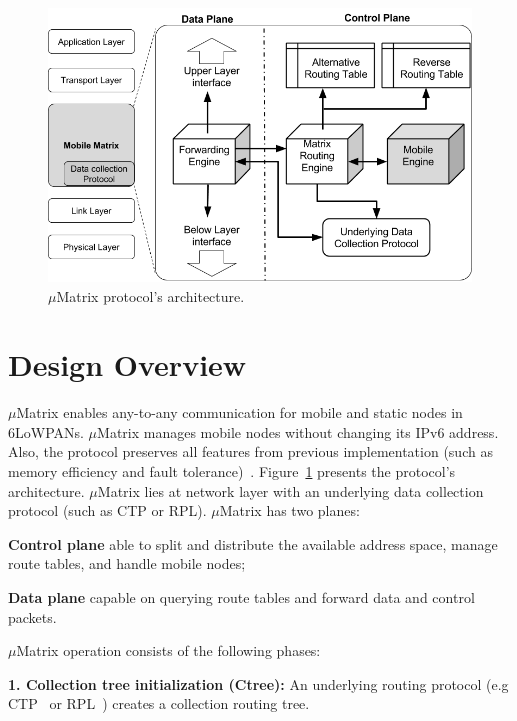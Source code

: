 
\begin{figure}[t!]
\includegraphics[width=\linewidth]{img/matrix-architecture-v3}
\caption{$\mu$Matrix protocol's architecture.}
\label{fig:architecture}
\end{figure}

\section{Design Overview}
\label{sec:design}

$\mu$Matrix enables any-to-any communication for mobile and static nodes in 6LoWPANs. $\mu$Matrix manages mobile nodes without changing its IPv6 address. Also, the protocol preserves all features from previous implementation (such as memory efficiency and fault tolerance)~\cite{Peres:2016}. 
Figure~\ref{fig:architecture} presents the protocol's architecture. $\mu$Matrix lies at network layer with an underlying data collection protocol (such as CTP or RPL). $\mu$Matrix has two planes: 
\begin{inparaenum}[i)]
  \item \textbf{Control plane} able to split and distribute the available address space, manage route tables, and handle mobile nodes;
  \item \textbf{Data plane} capable on querying route tables and forward data and control packets.
\end{inparaenum}
 
$\mu$Matrix operation consists of the following phases:  

\noindent \textbf{1. Collection tree initialization (Ctree):} An underlying routing protocol (e.g CTP~\cite{ctptosn2014} or RPL~\cite{lee2012rpl}) creates a collection routing tree.
    
